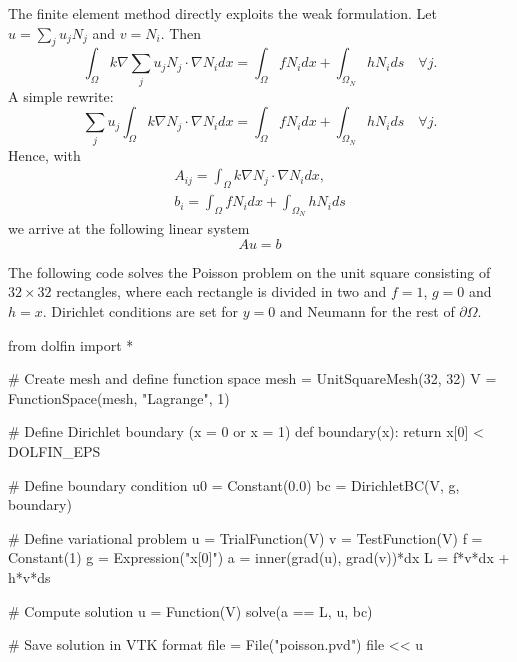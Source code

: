 The finite element method directly exploits the weak formulation. 
Let $u = \sum_j u_j N_j$ and $v=N_i$. 
Then 
\[
\int_\Omega k \nabla \sum_j u_j N_j  \cdot \nabla N_i dx = \int_\Omega f N_i dx + \int_{\Omega_N} h N_i ds  \quad \forall j .    
\]
A simple rewrite: 
\[
\sum_j u_j  \int_\Omega k \nabla  N_j  \cdot \nabla N_i dx = \int_\Omega f N_i dx + \int_{\Omega_N} h N_i ds \quad \forall j.    
\]
Hence, with  
\begin{eqnarray*}
A_{ij} = \int_\Omega k \nabla  N_j  \cdot \nabla N_i dx, \\  
b_i = \int_\Omega f N_i dx + \int_{\Omega_N} h N_i ds 
\end{eqnarray*}
we arrive at the following linear system 
\[
A u = b 
\]

The following code solves the Poisson problem on the unit square
consisting of $32\times 32$ rectangles, where each rectangle is divided
in two and $f=1$, $g=0$ and $h=x$. Dirichlet conditions are set 
for $y=0$ and Neumann for the rest of $\partial \Omega$.  

\begin{python}
from dolfin import *

# Create mesh and define function space
mesh = UnitSquareMesh(32, 32)
V = FunctionSpace(mesh, "Lagrange", 1)

# Define Dirichlet boundary (x = 0 or x = 1)
def boundary(x): return x[0] < DOLFIN_EPS 

# Define boundary condition
u0 = Constant(0.0)
bc = DirichletBC(V, g, boundary)

# Define variational problem
u = TrialFunction(V)
v = TestFunction(V)
f = Constant(1)
g = Expression("x[0]")
a = inner(grad(u), grad(v))*dx
L = f*v*dx + h*v*ds

# Compute solution
u = Function(V)
solve(a == L, u, bc)

# Save solution in VTK format
file = File("poisson.pvd")
file << u
\end{python}



